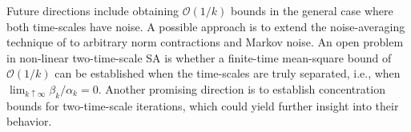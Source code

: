 \documentclass[letterpaper, 10 pt, conference]{ieeeconf}  %
\theoremstyle{definition}
\theoremstyle{plain}
\newtheorem{lemma}{Lemma}
\newcommand{\barf}{\overline{f}}
\newcommand{\Scal}{\mathcal{S}}
\newcommand{\UU}{\mathcal{U}}
\newcommand{\RR}{\mathbb{R}}
\begin{document}
Future directions include obtaining $\mathcal{O}(1/k)$ bounds in the general case where both time-scales have noise. A possible approach is to extend the noise-averaging technique of \cite{Chandak-1/k} to arbitrary norm contractions and Markov noise. An open problem in non-linear two-time-scale SA is whether a finite-time mean-square bound of $\mathcal{O}(1/k)$ can be established when the time-scales are truly separated, i.e., when $\lim_{k\uparrow\infty}\beta_k/\alpha_k=0$. Another promising direction is to establish concentration bounds for two-time-scale iterations, which could yield further insight into their behavior.

\end{document}

